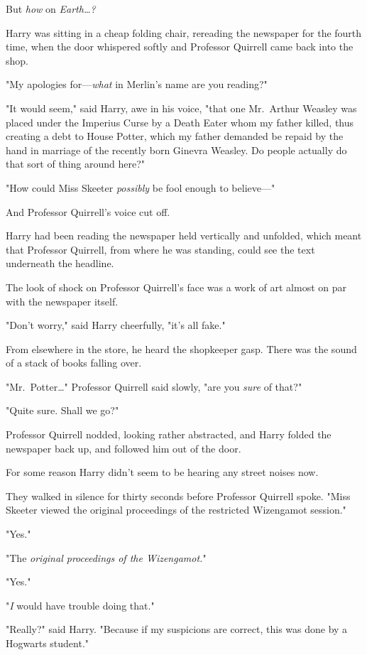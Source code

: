But \emph{how} on \emph{Earth{\ldots}?}

Harry was sitting in a cheap folding chair, rereading the newspaper for the 
fourth time, when the door whispered softly and Professor Quirrell came back 
into the shop.

"My apologies for---\emph{what} in Merlin's name are you reading?"

"It would seem," said Harry, awe in his voice, "that one Mr.~Arthur Weasley was 
placed under the Imperius Curse by a Death Eater whom my father killed, thus 
creating a debt to House Potter, which my father demanded be repaid by the hand 
in marriage of the recently born Ginevra Weasley. Do people actually do that 
sort of thing around here?"

"How could Miss Skeeter \emph{possibly} be fool enough to believe---"

And Professor Quirrell's voice cut off.

Harry had been reading the newspaper held vertically and unfolded, which meant 
that Professor Quirrell, from where he was standing, could see the text 
underneath the headline.

The look of shock on Professor Quirrell's face was a work of art almost on par 
with the newspaper itself.

"Don't worry," said Harry cheerfully, "it's all fake."

From elsewhere in the store, he heard the shopkeeper gasp. There was the sound 
of a stack of books falling over.

"Mr.~Potter{\ldots}" Professor Quirrell said slowly, "are you \emph{sure} of 
that?"

"Quite sure. Shall we go?"

Professor Quirrell nodded, looking rather abstracted, and Harry folded the 
newspaper back up, and followed him out of the door.

For some reason Harry didn't seem to be hearing any street noises now.

They walked in silence for thirty seconds before Professor Quirrell spoke. 
"Miss Skeeter viewed the original proceedings of the restricted Wizengamot 
session."

"Yes."

"The \emph{original proceedings of the Wizengamot.}"

"Yes."

"\emph{I} would have trouble doing that."

"Really?" said Harry. "Because if my suspicions are correct, this was done by a 
Hogwarts student."

